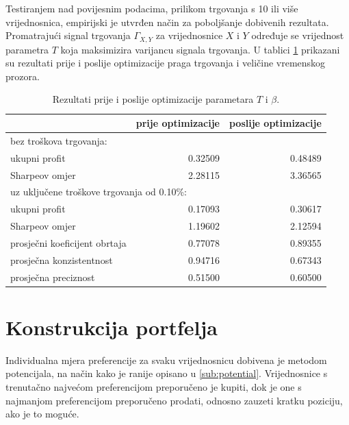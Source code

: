 \documentclass[lmodern, utf8, diplomski, numeric]{fer}
\begin{document}
  Testiranjem nad povijesnim podacima, prilikom trgovanja s 10 ili više vrijednosnica, empirijski je utvrđen način za poboljšanje dobivenih rezultata.
  Promatrajući signal trgovanja $\Gamma_{X, Y}$ za vrijednosnice $X$ i $Y$ određuje se vrijednost parametra $T$ koja maksimizira varijancu signala trgovanja.
  U tablici \ref{table:opt-results} prikazani su rezultati prije i poslije optimizacije praga trgovanja i veličine vremenskog prozora.
  
  \begin{table}[h]
    \centering
    \caption{Rezultati prije i poslije optimizacije parametara $T$ i $\beta$.}
    \label{table:opt-results}
    \begin{tabular}{lrr}
      \toprule
      & prije optimizacije & poslije optimizacije \\
      \midrule
      bez troškova trgovanja: & & \\
      ukupni profit & 0.32509 & 0.48489 \\
      Sharpeov omjer & 2.28115 & 3.36565 \\
      \midrule
      \multicolumn{3}{l}{uz uključene troškove trgovanja od 0.10\%:} \\
      ukupni profit & 0.17093 & 0.30617 \\
      Sharpeov omjer & 1.19602 & 2.12594 \\
      \midrule
      prosječni koeficijent obrtaja & 0.77078 & 0.89355 \\
      prosječna konzistentnost & 0.94716 & 0.67343 \\
      prosječna preciznost & 0.51500 & 0.60500 \\
      \bottomrule
    \end{tabular}
  \end{table}
  
  \section{Konstrukcija portfelja}
  Individualna mjera preferencije za svaku vrijednosnicu dobivena je metodom potencijala, na način kako je ranije opisano u \ref{sub:potential}.
  Vrijednosnice s trenutačno najvećom preferencijom preporučeno je kupiti, dok je one s najmanjom preferencijom preporučeno prodati, odnosno zauzeti kratku poziciju, ako je to moguće.
  
\end{document}
